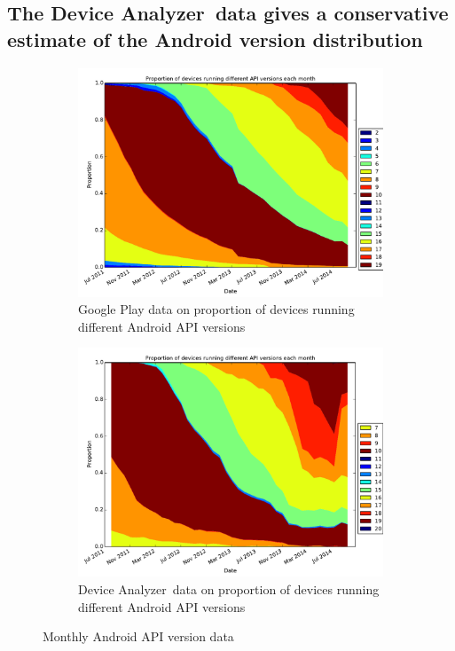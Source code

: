\documentclass[conference,a4paper,twoside]{IEEEtran}
\newcommand{\da}{Device Analyzer}
\begin{document}
\subsection{The \da\ data gives a conservative estimate of the Android version distribution}
\label{sec:representative}
\begin{figure}
 \centering
 \begin{subfigure}[b]{\columnwidth}
 \includegraphics[width=\columnwidth]{figures/googleplayapi}
 \caption{Google Play data on proportion of devices running different Android API versions}
 \label{fig:play_api}
\end{subfigure}
\begin{subfigure}[b]{\columnwidth}
 \includegraphics[width=\columnwidth]{figures/norm_api_gpcomp}
 \caption{\da\ data on proportion of devices running different Android API versions}
 \label{fig:da_api}
\end{subfigure}
\caption{Monthly Android API version data}
\end{figure}
\end{document}
